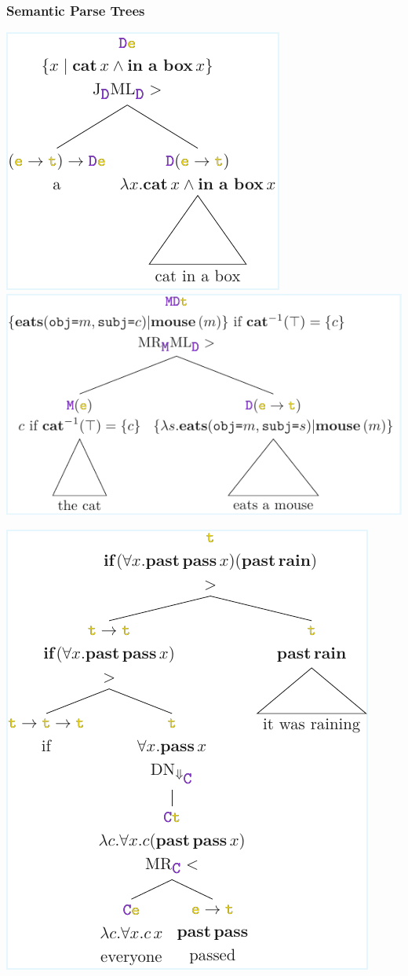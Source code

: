 \documentclass[math, english, info]{beamercours}
\begin{document}
\begin{frame}
	\frametitle{Semantic Parse Trees}
	\includegraphics{aux/figures/parse-tree-1.pdf}
	\centering
	\includegraphics{aux/figures/parse-tree-2.pdf}

	{\centering \includegraphics[height=.7\pageheight]{aux/figures/parse-tree-3.pdf}}
\end{frame}
\end{document}
